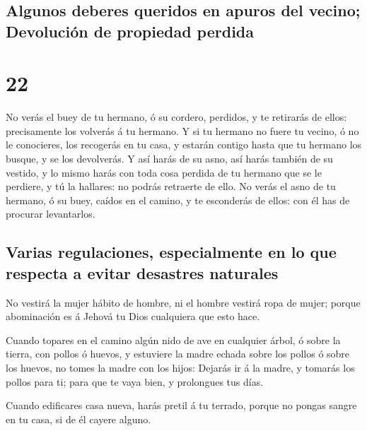 \hypertarget{algunos-deberes-queridos-en-apuros-del-vecino-devoluciuxf3n-de-propiedad-perdida}{%
\subsection{Algunos deberes queridos en apuros del vecino; Devolución de
propiedad
perdida}\label{algunos-deberes-queridos-en-apuros-del-vecino-devoluciuxf3n-de-propiedad-perdida}}

\hypertarget{section-21}{%
\section{22}\label{section-21}}

 No verás el buey de tu hermano, ó su cordero, perdidos, y
te retirarás de ellos: precisamente los volverás á tu hermano.
 Y si tu hermano no fuere tu vecino, ó no le conocieres,
los recogerás en tu casa, y estarán contigo hasta que tu hermano los
busque, y se los devolverás.  Y así harás de su asno, así
harás también de su vestido, y lo mismo harás con toda cosa perdida de
tu hermano que se le perdiere, y tú la hallares: no podrás retraerte de
ello.  No verás el asno de tu hermano, ó su buey, caídos
en el camino, y te esconderás de ellos: con él has de procurar
levantarlos.

\hypertarget{varias-regulaciones-especialmente-en-lo-que-respecta-a-evitar-desastres-naturales}{%
\subsection{Varias regulaciones, especialmente en lo que respecta a
evitar desastres
naturales}\label{varias-regulaciones-especialmente-en-lo-que-respecta-a-evitar-desastres-naturales}}

 No vestirá la mujer hábito de hombre, ni el hombre
vestirá ropa de mujer; porque abominación es á Jehová tu Dios cualquiera
que esto hace.

 Cuando topares en el camino algún nido de ave en
cualquier árbol, ó sobre la tierra, con pollos ó huevos, y estuviere la
madre echada sobre los pollos ó sobre los huevos, no tomes la madre con
los hijos:  Dejarás ir á la madre, y tomarás los pollos
para ti; para que te vaya bien, y prolongues tus días.

 Cuando edificares casa nueva, harás pretil á tu terrado,
porque no pongas sangre en tu casa, si de él cayere alguno.

